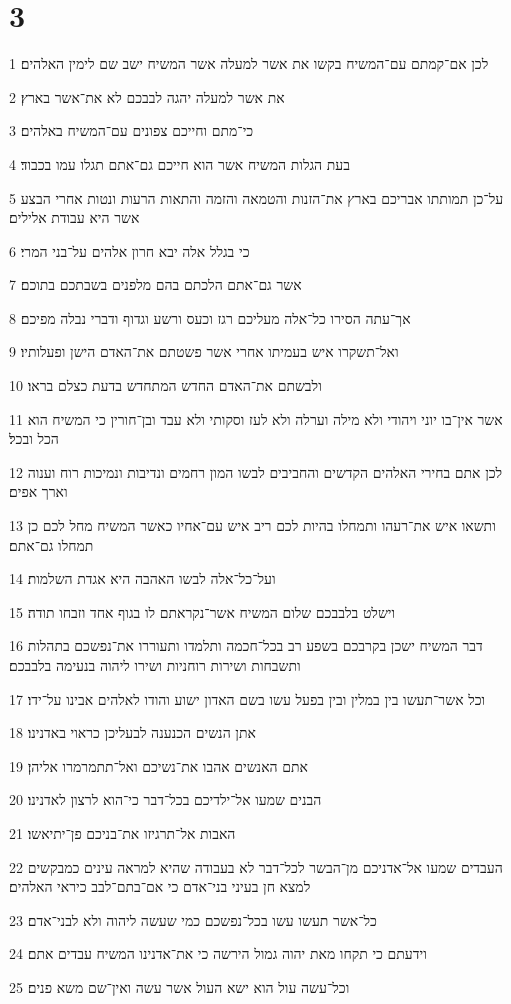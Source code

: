 \chapter{3}

\par 1 לכן אם־קמתם עם־המשיח בקשו את אשר למעלה אשר המשיח ישב שם לימין האלהים׃
\par 2 את אשר למעלה יהגה לבבכם לא את־אשר בארץ׃
\par 3 כי־מתם וחייכם צפונים עם־המשיח באלהים׃
\par 4 בעת הגלות המשיח אשר הוא חייכם גם־אתם תגלו עמו בכבוד׃
\par 5 על־כן תמותתו אבריכם בארץ את־הזנות והטמאה והזמה והתאות הרעות ונטות אחרי הבצע אשר היא עבודת אלילים׃
\par 6 כי בגלל אלה יבא חרון אלהים על־בני המרי׃
\par 7 אשר גם־אתם הלכתם בהם מלפנים בשבתכם בתוכם׃
\par 8 אך־עתה הסירו כל־אלה מעליכם רגז וכעס ורשע וגדוף ודברי נבלה מפיכם׃
\par 9 ואל־תשקרו איש בעמיתו אחרי אשר פשטתם את־האדם הישן ופעלותיו׃
\par 10 ולבשתם את־האדם החדש המתחדש בדעת כצלם בראו׃
\par 11 אשר אין־בו יוני ויהודי ולא מילה וערלה ולא לעז וסקותי ולא עבד ובן־חורין כי המשיח הוא הכל ובכל׃
\par 12 לכן אתם בחירי האלהים הקדשים והחביבים לבשו המון רחמים ונדיבות ונמיכות רוח וענוה וארך אפים׃
\par 13 ותשאו איש את־רעהו ותמחלו בהיות לכם ריב איש עם־אחיו כאשר המשיח מחל לכם כן תמחלו גם־אתם׃
\par 14 ועל־כל־אלה לבשו האהבה היא אגדת השלמות׃
\par 15 וישלט בלבבכם שלום המשיח אשר־נקראתם לו בגוף אחד וזבחו תודה׃
\par 16 דבר המשיח ישכן בקרבכם בשפע רב בכל־חכמה ותלמדו ותעוררו את־נפשכם בתהלות ותשבחות ושירות רוחניות ושירו ליהוה בנעימה בלבבכם׃
\par 17 וכל אשר־תעשו בין במלין ובין בפעל עשו בשם האדון ישוע והודו לאלהים אבינו על־ידו׃
\par 18 אתן הנשים הכנענה לבעליכן כראוי באדנינו׃
\par 19 אתם האנשים אהבו את־נשיכם ואל־תתמרמרו אליהן׃
\par 20 הבנים שמעו אל־ילדיכם בכל־דבר כי־הוא לרצון לאדנינו׃
\par 21 האבות אל־תרגיזו את־בניכם פן־יתיאשו׃
\par 22 העבדים שמעו אל־אדניכם מן־הבשר לכל־דבר לא בעבודה שהיא למראה עינים כמבקשים למצא חן בעיני בני־אדם כי אם־בתם־לבב כיראי האלהים׃
\par 23 כל־אשר תעשו עשו בכל־נפשכם כמי שעשה ליהוה ולא לבני־אדם׃
\par 24 וידעתם כי תקחו מאת יהוה גמול הירשה כי את־אדנינו המשיח עבדים אתם׃
\par 25 וכל־עשה עול הוא ישא העול אשר עשה ואין־שם משא פנים׃

